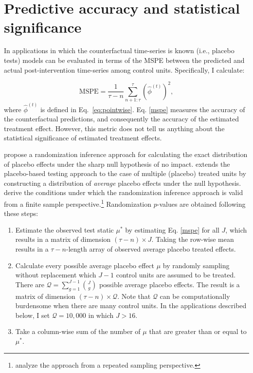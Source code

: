 \documentclass[hidelinks,12pt]{article}
\begin{document}
\section{Predictive accuracy and statistical significance} \label{eval}

In applications in which the counterfactual time-series is known (i.e., placebo tests) models can be evaluated in terms of the MSPE between the predicted and actual post-intervention time-series among control units. Specifically, I calculate:

\begin{equation}
	\text{MSPE} = \frac{1}{\tau-n} \sum_{n+1: \tau}^{\tau} \left(\hat{\phi}^{(t)} \right)^2, \label{mspe}
\end{equation} where $\hat{\phi}^{(t)}$ is defined in Eq.~\ref{eq:pointwise}. Eq. \ref{mspe} measures the accuracy of the counterfactual predictions, and consequently the accuracy of the estimated treatment effect. However, this metric does not tell us anything about the statistical significance of estimated treatment effects. 

\citet{abadie2010synthetic} propose a randomization inference approach for calculating the exact distribution of placebo effects under the sharp null hypothesis of no impact. \citet{cavallo2013catastrophic} extends the placebo-based testing approach to the case of multiple (placebo) treated units by constructing a distribution of \emph{average} placebo effects under the null hypothesis. \citet{firpo2018synthetic} derive the conditions under which the randomization inference approach is valid from a finite sample perspective.\footnote{\citet{hahn2017synthetic} analyze the approach from a repeated sampling perspective.} Randomization $p$-values are obtained following these steps:

\begin{enumerate} 
	\item Estimate the observed test static $\mu^{*}$ by estimating Eq. \ref{mspe} for all $J$, which results in a matrix of dimension $(\tau-n) \times J$. Taking the row-wise mean results in a $\tau-n$-length array of observed average placebo treated effects. 
	\item Calculate every possible average placebo effect $\mu$ by randomly sampling without replacement which $J-1$ control units are assumed to be treated. There are $\mathcal{Q} = \sum\limits_{g=1}^{J-1} {J \choose g}$ possible average placebo effects. The result is a matrix of dimension $(\tau-n) \times \mathcal{Q}$. Note that $\mathcal{Q}$ can be computationally burdensome when there are many control units. In the applications described below, I set $\mathcal{Q} = 10,000$ in which $J > 16$.
	\item Take a column-wise sum of the number of $\mu$ that are greater than or equal to $\mu^{*}$.  
\end{enumerate}
\end{document}
